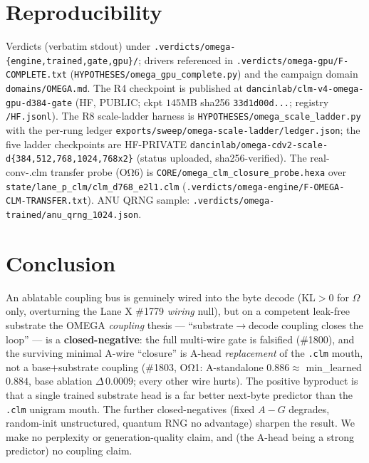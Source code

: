 \documentclass[11pt]{article}
\begin{document}
\section{Reproducibility}
\label{sec:repro}
Verdicts (verbatim stdout) under \texttt{.verdicts/omega-\{engine,trained,gate,gpu\}/}; drivers
referenced in \texttt{.verdicts/omega-gpu/F-COMPLETE.txt} (\texttt{HYPOTHESES/omega\_gpu\_complete.py})
and the campaign domain \texttt{domains/OMEGA.md}. The R4 checkpoint is published at
\texttt{dancinlab/clm-v4-omega-gpu-d384-gate} (HF, PUBLIC; ckpt $145$MB
sha256 \texttt{33d1d00d...}; registry \texttt{/HF.jsonl}). The R8 scale-ladder harness is
\texttt{HYPOTHESES/omega\_scale\_ladder.py} with the per-rung ledger
\texttt{exports/sweep/omega-scale-ladder/ledger.json}; the five ladder checkpoints are HF-PRIVATE
\texttt{dancinlab/omega-cdv2-scale-d\{384,512,768,1024,768x2\}} (status uploaded, sha256-verified).
The real-conv-.clm transfer probe (OΩ6) is
\texttt{CORE/omega\_clm\_closure\_probe.hexa} over
\texttt{state/lane\_p\_clm/clm\_d768\_e2l1.clm}
(\texttt{.verdicts/omega-engine/F-OMEGA-CLM-TRANSFER.txt}). ANU QRNG sample:
\texttt{.verdicts/omega-trained/anu\_qrng\_1024.json}.

\section{Conclusion}
\label{sec:conclusion}
An ablatable coupling bus is genuinely wired into the byte decode (KL$>0$ for $\Omega$ only,
overturning the Lane X \#1779 \emph{wiring} null), but on a competent leak-free substrate the
OMEGA \emph{coupling} thesis --- ``substrate$\rightarrow$decode coupling closes the loop'' ---
is a \textbf{closed-negative}: the full multi-wire gate is falsified (\#1800), and the surviving
minimal A-wire ``closure'' is A-head \emph{replacement} of the \texttt{.clm} mouth, not a
base$+$substrate coupling (\#1803, OΩ1: A-standalone $0.886\approx$ min\_learned $0.884$, base
ablation $\Delta\,0.0009$; every other wire hurts). The positive byproduct is that a single
trained substrate head is a far better next-byte predictor than the \texttt{.clm} unigram mouth.
The further closed-negatives (fixed $A{-}G$ degrades, random-init unstructured, quantum RNG no
advantage) sharpen the result. We make no perplexity or generation-quality claim, and (the
A-head being a strong predictor) no coupling claim.

\nocite{anima_omega_engine_1783,anima_omega_trained_1784,anima_omega_gate_1786,%
anima_omega_gpu_1791,anima_lanex_1779}


\end{document}
